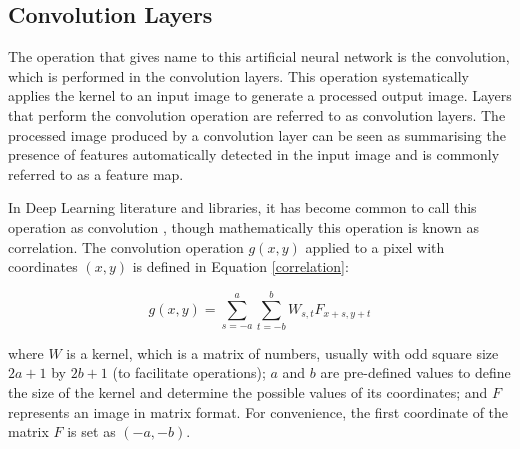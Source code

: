 \subsection{Convolution Layers}

The operation that gives name to this artificial neural network is the convolution, which is performed in the convolution layers. This operation systematically applies the kernel to an input image to generate a processed output image. Layers that perform the convolution operation are referred to as convolution layers. The processed image produced by a convolution layer can be seen as summarising the presence of features automatically detected in the input image \cite{Brownlee2019} and is commonly referred to as a feature map. %


In Deep Learning  literature and libraries, it has become common to call this operation as convolution \cite{goodfellow2016}, though mathematically this operation is known as  correlation. The convolution operation $g(x,y)$ applied to a pixel with coordinates $(x,y)$ is defined in Equation \ref{correlation}:

\begin{equation}
\label{correlation}
g(x,y)= \sum_{s=-a}^a\sum_{t=-b}^bW_{s,t}F_{x+s,y+t}
\end{equation}

\noindent where $W$ is a kernel, which is a matrix of numbers, usually with odd square size $2a + 1$ by $2b + 1$ (to facilitate operations); $a$ and $b$ are pre-defined values to define the size of the kernel and determine the possible values of its coordinates; and $F$ represents an image in matrix format. For convenience, the first coordinate of the matrix $F$ is set as $(-a,-b)$. %



